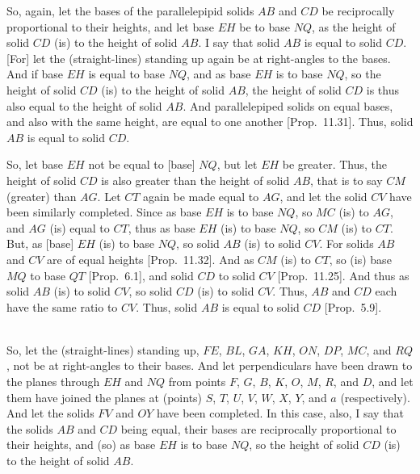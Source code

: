 So, again, let the bases of the parallelepipid solids $AB$ and $CD$
be reciprocally proportional to their heights, and let base $EH$
be to base $NQ$, as the height of solid $CD$ (is) to the
height of solid $AB$. I say that solid $AB$ is equal to solid $CD$.
\mbox{[}For] let the (straight-lines) standing up again be at right-angles to the
bases. And if base $EH$ is equal to base $NQ$, and as base $EH$
is to base $NQ$, so the height of solid $CD$ (is) to the
height of solid $AB$, the height of solid $CD$ is thus also
equal to the height of solid $AB$. And parallelepiped solids on equal
bases, and also with the same height,  are equal to one another [Prop.~11.31]. Thus, solid $AB$ is equal to solid $CD$.

So, let base $EH$ not be equal to [base] $NQ$, but let $EH$ be greater.
Thus, the height of solid $CD$ is also greater than the height of
solid $AB$, that is to say $CM$ (greater) than $AG$. Let $CT$ again
be made equal to $AG$, and let the solid $CV$ have been similarly
completed.  Since as base $EH$ is to base $NQ$, so $MC$ (is) to
$AG$, and $AG$ (is) equal to $CT$, thus as base $EH$ (is) to
base $NQ$, so $CM$ (is) to $CT$.  But, as [base] $EH$ (is) to base
$NQ$, so solid $AB$ (is) to solid $CV$. For solids $AB$ and $CV$ are of equal heights [Prop.~11.32].
And as $CM$ (is) to $CT$, so (is) base $MQ$ to base $QT$ [Prop.~6.1], and solid $CD$ to solid $CV$ [Prop.~11.25]. And thus as solid $AB$ (is) to solid
$CV$, so solid $CD$ (is) to solid $CV$. Thus, $AB$ and $CD$ each
have the same ratio to $CV$. Thus, solid $AB$ is equal to solid
$CD$ [Prop.~5.9].\\~\\

\epsfysize=3in
\centerline{}

So, let the (straight-lines) standing up, $FE$, $BL$, $GA$, $KH$, $ON$,
$DP$, $MC$, and $RQ$, not be at right-angles to their bases.
And let perpendiculars have been drawn to the planes through $EH$ and
$NQ$ from points $F$, $G$, $B$, $K$, $O$, $M$, $R$, and $D$, 
and let them have joined the planes at (points) $S$, $T$, $U$, $V$, $W$,
$X$, $Y$, and $a$ (respectively). And let the solids $FV$ and $OY$
have been completed. In this case,  also, I say that the solids $AB$ and
$CD$ being equal, their bases are reciprocally proportional to their
heights, and (so) as base $EH$ is to base $NQ$, so the height of
solid $CD$ (is) to the height of solid $AB$.

